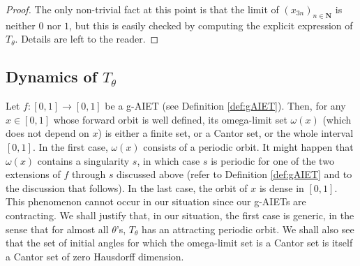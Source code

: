 \documentclass[11pt]{article}
\begin{document}
\begin{proof}
    The only non-trivial fact at this point is that the limit of $\left(x_{3n}\right)_{n\in\mathbf{N}}$ is neither $0$ nor $1$, but this is easily  checked by computing the explicit expression of $T_{\theta}$. Details are left to the reader.
\end{proof}

\subsection{Dynamics of $T_{\theta}$}

Let $f:\left[0,1\right]\rightarrow\left[0,1\right]$ be a g-AIET (see Definition \ref{def:gAIET}). Then, for any $x\in\left[0,1\right]$ whose forward orbit is well defined, its omega-limit set $\omega\left(x\right)$ (which does not depend on $x$) is either a finite set, or a Cantor set, or the whole interval $\left[0,1\right]$. In the first case, $\omega\left(x\right)$ consists of a periodic orbit. It might happen that $\omega\left(x\right)$ contains a singularity $s$, in which case $s$ is periodic for one of the two extensions of $f$ through $s$ discussed above (refer to Definition \ref{def:gAIET} and to the discussion that follows). In the last case, the orbit of $x$ is dense in $\left[0,1\right]$. This phenomenon cannot occur in our situation since our g-AIETs are contracting. We shall justify that, in our situation, the first case is generic, in the sense that for almost all $\theta$'s, $T_{\theta}$ has an attracting periodic orbit. We shall also see that the set of initial angles for which the omega-limit set is a Cantor set is itself a Cantor set of zero Hausdorff dimension.
\end{document}
